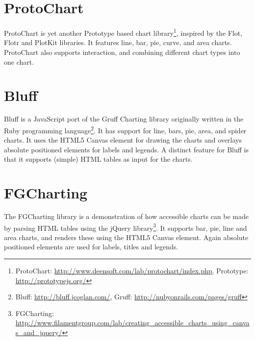 \section*{ProtoChart}
ProtoChart is yet another Prototype based chart library\footnote{ProtoChart: \url{http://www.deensoft.com/lab/protochart/index.php}, Prototype: \url{http://prototypejs.org/}}, inspired by the Flot, Flotr and PlotKit libraries. It features line, bar, pie, curve, and area charts. ProtoChart also supports interaction, and combining different chart types into one chart.

\section*{Bluff}
Bluff is a JavaScript port of the Gruff Charting library originally written in the Ruby programming language\footnote{Bluff: \url{http://bluff.jcoglan.com/}, Gruff: \url{http://nubyonrails.com/pages/gruff}}. It has support for line, bars, pie, area, and spider charts. It uses the HTML5 Canvas element for drawing the charts and overlays absolute positioned  elements for labels and legends. A distinct feature for Bluff is that it supports (simple) HTML tables as input for the charts.

\section*{FGCharting}
The FGCharting library is a demonstration of how accessible charts can be made by parsing HTML tables using the jQuery library\footnote{FGCharting: \url{http://www.filamentgroup.com/lab/creating\_accessible\_charts\_using\_canvas\_and\_jquery/}}. It supports bar, pie, line and area charts, and renders these using the HTML5 Canvas element. Again absolute positioned  elements are used for labels, titles and legends.
